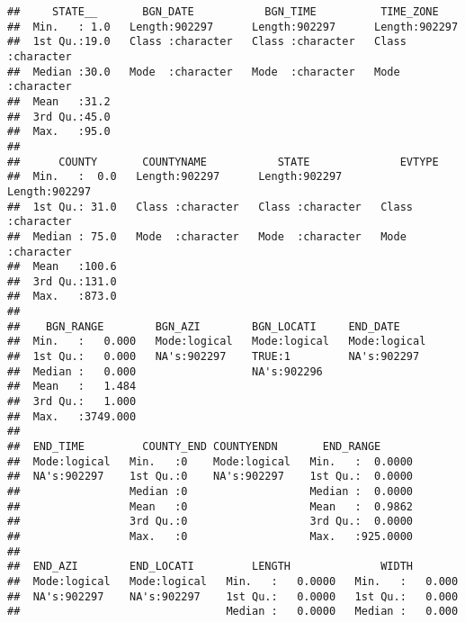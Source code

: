 \documentclass[]{article}
\begin{document}
\begin{verbatim}
##     STATE__       BGN_DATE           BGN_TIME          TIME_ZONE        
##  Min.   : 1.0   Length:902297      Length:902297      Length:902297     
##  1st Qu.:19.0   Class :character   Class :character   Class :character  
##  Median :30.0   Mode  :character   Mode  :character   Mode  :character  
##  Mean   :31.2                                                           
##  3rd Qu.:45.0                                                           
##  Max.   :95.0                                                           
##                                                                         
##      COUNTY       COUNTYNAME           STATE              EVTYPE         
##  Min.   :  0.0   Length:902297      Length:902297      Length:902297     
##  1st Qu.: 31.0   Class :character   Class :character   Class :character  
##  Median : 75.0   Mode  :character   Mode  :character   Mode  :character  
##  Mean   :100.6                                                           
##  3rd Qu.:131.0                                                           
##  Max.   :873.0                                                           
##                                                                          
##    BGN_RANGE        BGN_AZI        BGN_LOCATI     END_DATE      
##  Min.   :   0.000   Mode:logical   Mode:logical   Mode:logical  
##  1st Qu.:   0.000   NA's:902297    TRUE:1         NA's:902297   
##  Median :   0.000                  NA's:902296                  
##  Mean   :   1.484                                               
##  3rd Qu.:   1.000                                               
##  Max.   :3749.000                                               
##                                                                 
##  END_TIME         COUNTY_END COUNTYENDN       END_RANGE       
##  Mode:logical   Min.   :0    Mode:logical   Min.   :  0.0000  
##  NA's:902297    1st Qu.:0    NA's:902297    1st Qu.:  0.0000  
##                 Median :0                   Median :  0.0000  
##                 Mean   :0                   Mean   :  0.9862  
##                 3rd Qu.:0                   3rd Qu.:  0.0000  
##                 Max.   :0                   Max.   :925.0000  
##                                                               
##  END_AZI        END_LOCATI         LENGTH              WIDTH         
##  Mode:logical   Mode:logical   Min.   :   0.0000   Min.   :   0.000  
##  NA's:902297    NA's:902297    1st Qu.:   0.0000   1st Qu.:   0.000  
##                                Median :   0.0000   Median :   0.000  

\end{verbatim}
\end{document}
